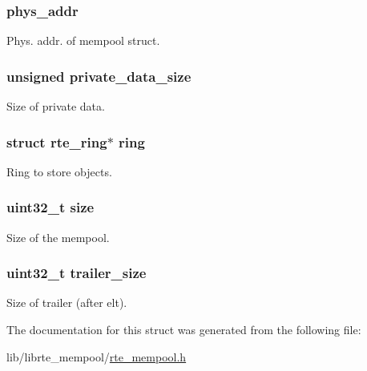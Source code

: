 \subsubsection[{phys\+\_\+addr}]{ phys\+\_\+addr}\label{structrte__mempool_a3901f538726d14b9ad14e0bd7578c959}
Phys. addr. of mempool struct. \hypertarget{structrte__mempool_ae143f874098aaedbee52452a967722d0}{}
\subsubsection[{private\+\_\+data\+\_\+size}]{\setlength{\rightskip}{0pt plus 5cm}unsigned private\+\_\+data\+\_\+size}\label{structrte__mempool_ae143f874098aaedbee52452a967722d0}
Size of private data. \hypertarget{structrte__mempool_a1dfc25cca5a340eff30700b60fd41339}{}
\subsubsection[{ring}]{\setlength{\rightskip}{0pt plus 5cm}struct {\bf rte\+\_\+ring}$\ast$ ring}\label{structrte__mempool_a1dfc25cca5a340eff30700b60fd41339}
Ring to store objects. \hypertarget{structrte__mempool_ab2c6b258f02add8fdf4cfc7c371dd772}{}
\subsubsection[{size}]{\setlength{\rightskip}{0pt plus 5cm}uint32\+\_\+t size}\label{structrte__mempool_ab2c6b258f02add8fdf4cfc7c371dd772}
Size of the mempool. \hypertarget{structrte__mempool_aa328aea47b0ee3552e4628a4ed5dadac}{}
\subsubsection[{trailer\+\_\+size}]{\setlength{\rightskip}{0pt plus 5cm}uint32\+\_\+t trailer\+\_\+size}\label{structrte__mempool_aa328aea47b0ee3552e4628a4ed5dadac}
Size of trailer (after elt). 

The documentation for this struct was generated from the following file\+:\begin{DoxyCompactItemize}
\item 
lib/librte\+\_\+mempool/\hyperlink{rte__mempool_8h}{rte\+\_\+mempool.\+h}\end{DoxyCompactItemize}
